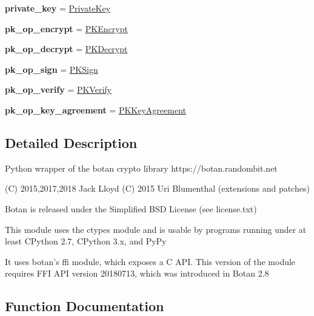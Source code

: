 \begin{DoxyCompactItemize}
{\bfseries private\+\_\+key} = \mbox{\hyperlink{classbotan2_1_1_private_key}{Private\+Key}}
\item 
\mbox{\label{namespacebotan2_acd657c07bcf11b000f999dc8cee4f42e}} 
{\bfseries pk\+\_\+op\+\_\+encrypt} = \mbox{\hyperlink{classbotan2_1_1_p_k_encrypt}{P\+K\+Encrypt}}
\item 
\mbox{\label{namespacebotan2_a20df69628b42e5555b9ee1357c919ceb}} 
{\bfseries pk\+\_\+op\+\_\+decrypt} = \mbox{\hyperlink{classbotan2_1_1_p_k_decrypt}{P\+K\+Decrypt}}
\item 
\mbox{\label{namespacebotan2_abeb04222756e488978235baf8cd5e68a}} 
{\bfseries pk\+\_\+op\+\_\+sign} = \mbox{\hyperlink{classbotan2_1_1_p_k_sign}{P\+K\+Sign}}
\item 
\mbox{\label{namespacebotan2_a881e48eb0731e562df3de156890696ca}} 
{\bfseries pk\+\_\+op\+\_\+verify} = \mbox{\hyperlink{classbotan2_1_1_p_k_verify}{P\+K\+Verify}}
\item 
\mbox{\label{namespacebotan2_a5eb304bd97ad7d72045c1a06a52ae824}} 
{\bfseries pk\+\_\+op\+\_\+key\+\_\+agreement} = \mbox{\hyperlink{classbotan2_1_1_p_k_key_agreement}{P\+K\+Key\+Agreement}}
\end{DoxyCompactItemize}


\subsection{Detailed Description}
\begin{DoxyVerb}Python wrapper of the botan crypto library
https://botan.randombit.net

(C) 2015,2017,2018 Jack Lloyd
(C) 2015 Uri  Blumenthal (extensions and patches)

Botan is released under the Simplified BSD License (see license.txt)

This module uses the ctypes module and is usable by programs running
under at least CPython 2.7, CPython 3.x, and PyPy

It uses botan's ffi module, which exposes a C API. This version of the
module requires FFI API version 20180713, which was introduced in
Botan 2.8\end{DoxyVerb}
 

\subsection{Function Documentation}
\mbox{\label{namespacebotan2_a4007ddd20b2518c25853bc23fcd57b2c}} 
